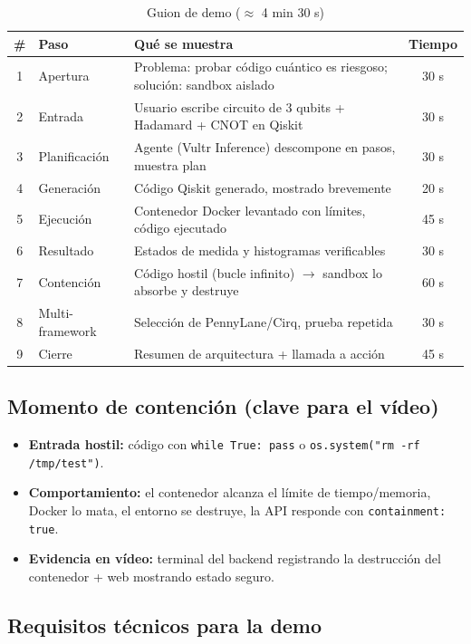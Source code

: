 \documentclass[11pt,a4paper]{article}
\begin{document}
\begin{table}[h]
\centering
\begin{tabular}{clp{6cm}c}
\toprule
\# & Paso & Qué se muestra & Tiempo \\
\midrule
1 & Apertura & Problema: probar código cuántico es riesgoso; solución: sandbox aislado & 30 s \\
2 & Entrada & Usuario escribe circuito de 3 qubits + Hadamard + CNOT en Qiskit & 30 s \\
3 & Planificación & Agente (Vultr Inference) descompone en pasos, muestra plan & 30 s \\
4 & Generación & Código Qiskit generado, mostrado brevemente & 20 s \\
5 & Ejecución & Contenedor Docker levantado con límites, código ejecutado & 45 s \\
6 & Resultado & Estados de medida y histogramas verificables & 30 s \\
7 & Contención & Código hostil (bucle infinito) $\rightarrow$ sandbox lo absorbe y destruye & 60 s \\
8 & Multi-framework & Selección de PennyLane/Cirq, prueba repetida & 30 s \\
9 & Cierre & Resumen de arquitectura + llamada a acción & 45 s \\
\bottomrule
\end{tabular}
\caption{Guion de demo ($\approx$ 4 min 30 s)}
\end{table}

\subsection{Momento de contención (clave para el vídeo)}

\begin{itemize}
    \item \textbf{Entrada hostil:} código con \texttt{while True: pass} o
    \texttt{os.system("rm -rf /tmp/test")}.
    \item \textbf{Comportamiento:} el contenedor alcanza el límite de tiempo/memoria,
    Docker lo mata, el entorno se destruye, la API responde con
    \texttt{containment: true}.
    \item \textbf{Evidencia en vídeo:} terminal del backend registrando la
    destrucción del contenedor + web mostrando estado seguro.
\end{itemize}

\subsection{Requisitos técnicos para la demo}
\end{document}
